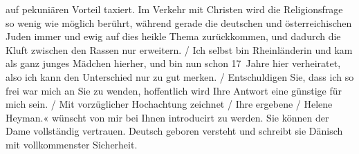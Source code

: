 {{{                        auf pekuniären Vorteil taxiert. Im Verkehr mit Christen wird die
                        Religionsfrage so wenig wie möglich berührt, während gerade die deutschen und österreichischen Juden immer und ewig auf dies heikle
                        Thema zurückkommen, und dadurch die Kluft zwischen den Rassen nur
                        erweitern.{ / }Ich selbst bin Rheinländerin und kam als ganz junges Mädchen hierher, und bin nun
                        schon 17 Jahre hier verheiratet, also ich kann den Unterschied nur {\pb}zu
                        gut merken.{ / }Entschuldigen Sie, dass ich so frei war mich an Sie zu wenden, hoffentlich
                        wird Ihre Antwort eine günstige für mich sein.{ / }Mit vorzüglicher Hochachtung zeichnet{ / }Ihre ergebene{ / }Helene Heyman.«}}}\label{K_L02049-1} wünscht von mir bei Ihnen introducirt zu werden. Sie können der
               Dame vollständig vertrauen. Deutsch geboren versteht und schreibt sie Dänisch mit vollkommenster Sicherheit.\pend
           \endnumbering{}  
      